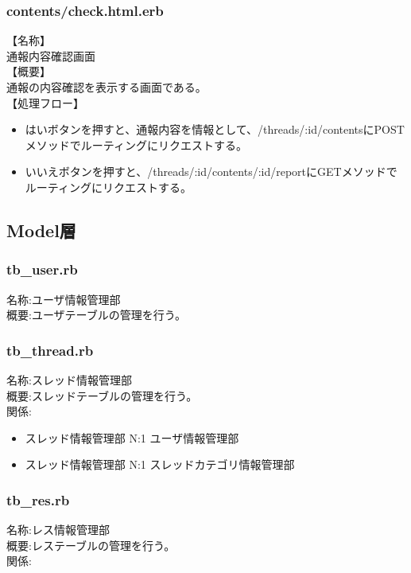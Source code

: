 \documentclass[a4j]{jarticle}
\begin{document}
\subsubsection{contents/check.html.erb}
\noindent
【名称】\\
通報内容確認画面\\
【概要】\\
通報の内容確認を表示する画面である。\\
【処理フロー】
\begin{itemize}
  \item はいボタンを押すと、通報内容を情報として、/threads/:id/contentsにPOSTメソッドでルーティングにリクエストする。
  \item いいえボタンを押すと、/threads/:id/contents/:id/reportにGETメソッドでルーティングにリクエストする。
\end{itemize}

\subsection{Model層}

\subsubsection{tb\_user.rb}
  \noindent
  名称:ユーザ情報管理部\\
  概要:ユーザテーブルの管理を行う。\\

\subsubsection{tb\_thread.rb}
  \noindent
  名称:スレッド情報管理部\\
  概要:スレッドテーブルの管理を行う。\\
  関係:
  \begin{itemize}
  \item スレッド情報管理部 N:1 ユーザ情報管理部
  \item スレッド情報管理部 N:1 スレッドカテゴリ情報管理部
  \end{itemize}

\subsubsection{tb\_res.rb}
  \noindent
  名称:レス情報管理部\\
  概要:レステーブルの管理を行う。\\
  関係:
\end{document}
